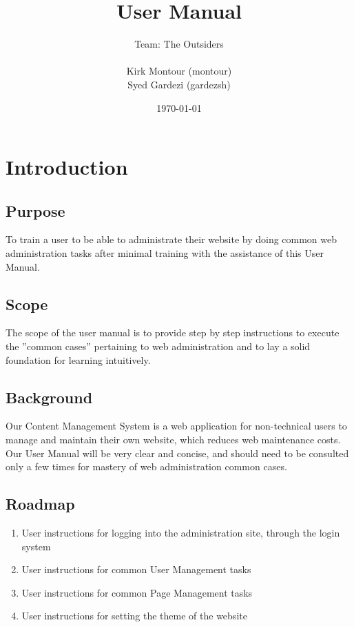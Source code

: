 \documentclass[12pt]{article}
\begin{document}
\title{User Manual} 
\author{Team: The Outsiders\\ \\ Kirk Montour (montour)\\ Syed Gardezi (gardezsh)}
\date{\today}
  
\maketitle

\pagebreak

\tableofcontents

\pagebreak

\section{Introduction}

\subsection{Purpose}
To train a user to be able to administrate their website by doing common web administration tasks after minimal training with the assistance of this User Manual.

\subsection{Scope}
The scope of the user manual is to provide step by step instructions to execute the ''common cases'' pertaining to web administration and to lay a solid foundation for learning intuitively.

\subsection{Background}
Our Content Management System is a web application for non-technical users to manage and maintain their own website, which reduces web maintenance costs. Our User Manual will be very clear and concise, and should need to be consulted only a few times for mastery of web administration common cases.

\subsection{Roadmap}

\begin{enumerate}
  \item User instructions for logging into the administration site, through the login system
  \item User instructions for common User Management tasks
  \item User instructions for common Page Management tasks
  \item User instructions for setting the theme of the website
\end{enumerate}
\end{document}
